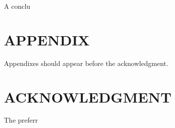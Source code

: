 \documentclass[letterpaper, 10 pt, conference]{ieeeconf}  %
\begin{document}
A conclu

\addtolength{\textheight}{-12cm}   %







\section*{APPENDIX}

Appendixes should appear before the acknowledgment.

\section*{ACKNOWLEDGMENT}

The preferr






\end{document}
